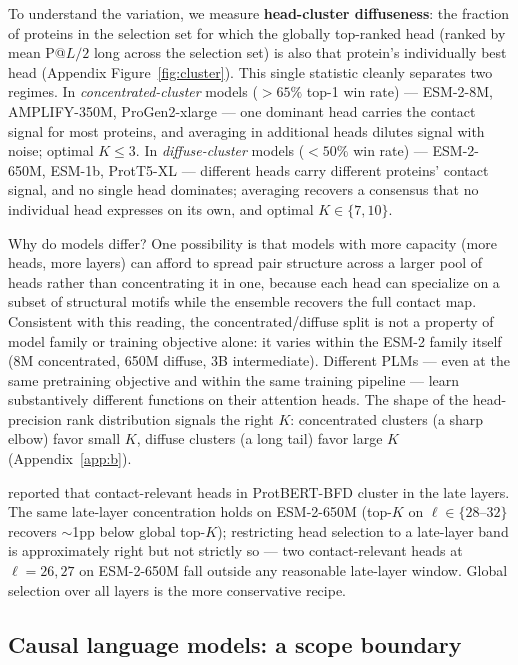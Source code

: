 \documentclass{article}
\begin{document}
To understand the variation, we measure \textbf{head-cluster
diffuseness}: the fraction of proteins in the selection set for which
the globally top-ranked head (ranked by mean P@$L/2$ long across the
selection set) is also that protein's individually best head
(Appendix Figure~\ref{fig:cluster}). This single statistic cleanly
separates two regimes. In \emph{concentrated-cluster} models
($>65\%$ top-1 win rate) --- ESM-2-8M, AMPLIFY-350M, ProGen2-xlarge
--- one dominant head carries the contact signal for most proteins,
and averaging in additional heads dilutes signal with noise; optimal
$K \leq 3$. In \emph{diffuse-cluster} models ($<50\%$ win rate) ---
ESM-2-650M, ESM-1b, ProtT5-XL --- different heads carry different
proteins' contact signal, and no single head dominates; averaging
recovers a consensus that no individual head expresses on its own,
and optimal $K \in \{7, 10\}$.

Why do models differ? One possibility is that models with more
capacity (more heads, more layers) can afford to spread pair
structure across a larger pool of heads rather than concentrating
it in one, because each head can specialize on a subset of
structural motifs while the ensemble recovers the full contact map.
Consistent with this reading, the concentrated/diffuse split is not
a property of model family or training objective alone: it varies
within the ESM-2 family itself (8M concentrated, 650M diffuse, 3B
intermediate). Different PLMs --- even at the same pretraining
objective and within the same training pipeline --- learn
substantively different functions on their attention heads. The shape
of the head-precision rank distribution signals the right $K$:
concentrated clusters (a sharp elbow) favor small $K$, diffuse clusters
(a long tail) favor large $K$ (Appendix~\ref{app:b}).

\citet{bhattacharya2021attention} reported that contact-relevant heads in
ProtBERT-BFD cluster in the late layers. The same late-layer concentration
holds on ESM-2-650M (top-$K$ on $\ell \in \{28\text{--}32\}$ recovers
$\sim$1pp below global top-$K$); restricting head selection to a late-layer
band is approximately right but not strictly so --- two contact-relevant
heads at $\ell{=}26,27$ on ESM-2-650M fall outside any reasonable late-layer
window. Global selection over all layers is the more conservative recipe.

\subsection{Causal language models: a scope boundary}
\label{sec:causal}
\end{document}
